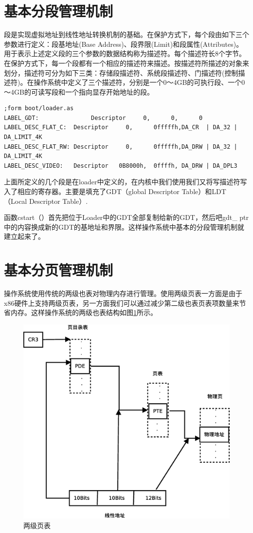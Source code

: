 \documentclass[UTF8,nofonts,cs4size]{ctexrep}
\begin{document}
\section{基本分段管理机制}
段是实现虚拟地址到线性地址转换机制的基础。在保护方式下，每个段由如下三个参数进行定义：段基地址(Base Address)、段界限(Limit)和段属性(Attributes)。用于表示上述定义段的三个参数的数据结构称为描述符。每个描述符长8个字节。在保护方式下，每一个段都有一个相应的描述符来描述。按描述符所描述的对象来划分，描述符可分为如下三类：存储段描述符、系统段描述符、门描述符(控制描述符)。在操作系统中定义了三个描述符，分别是一个0～4GB的可执行段、一个0～4GB的可读写段和一个指向显存开始地址的段。
\begin{lstlisting}
;form boot/loader.as
LABEL_GDT:               Descriptor     0,      0,      0
LABEL_DESC_FLAT_C:	Descriptor     0,      0fffffh,DA_CR  | DA_32 | DA_LIMIT_4K
LABEL_DESC_FLAT_RW:	Descriptor     0,      0fffffh,DA_DRW | DA_32 | DA_LIMIT_4K
LABEL_DESC_VIDEO:	Descriptor	 0B8000h,  0ffffh, DA_DRW | DA_DPL3	         
\end{lstlisting}
上面所定义的几个段是在loader中定义的，在内核中我们使用我们又将写描述符写入了相应的寄存器。主要是填充了GDT（global Descriptor Table）和LDT（Local Descriptor Table）.

函数cstart（）首先把位于Loader中的GDT全部复制给新的GDT，然后吧gdt\_ ptr中的内容换成新的GDT的基地址和界限。这样操作系统中基本的分段管理机制就建立起来了。
\section{基本分页管理机制}
操作系统使用传统的两级也表对物理内存进行管理。使用两级页表一方面是由于x86硬件上支持两级页表，另一方面我们可以通过减少第二级也表页表项数量来节省内存。这样操作系统的两级也表结构如图\ref{page}所示。
\begin{figure}[htp]
\centering
\includegraphics[scale=0.4]{page.eps}
\caption{两级页表}
\label{page}
\end{figure}
\end{document}
